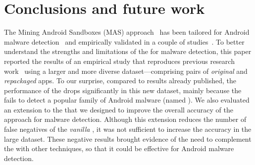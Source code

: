 \section{Conclusions and future work}\label{sec:conclusions}

The Mining Android Sandboxes (MAS) approach~\cite{DBLP:conf/icse/JamrozikZ16}
has been tailored for Android malware detection~\cite{DBLP:conf/wcre/BaoLL18}
and empirically validated in a couple of studies~\cite{DBLP:conf/wcre/BaoLL18,DBLP:conf/iceccs/LeB0GL18,DBLP:journals/jss/CostaMMSSBNR22}.
To better understand the strengths and limitations of the \mas for malware detection,
this paper reported the results of an empirical study that reproduces previous research
work~\cite{DBLP:conf/wcre/BaoLL18,DBLP:journals/jss/CostaMMSSBNR22} using a larger and more
diverse dataset---comprising \apps pairs of \emph{original} and \emph{repackaged} apps.
To our surprise, compared to results already published,
the performance of the \mas drops significantly in this new dataset, mainly
because the \mas fails to detect a popular family of Android malware (named \gps). 
We also evaluated an extension to the \mas that we designed to improve the overall
accuracy of the approach for malware detection.
Although this extension reduces the number of false negatives of the \emph{vanilla \mas}, it was not
sufficient to increase the \mas accuracy in the large dataset. These negative results
brought evidence of the need to complement the \mas with other techniques, so that it could be
effective for Android malware detection.
